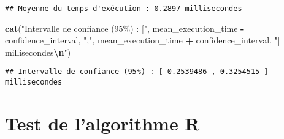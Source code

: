 \documentclass[
]{article}
\newenvironment{Shaded}{\begin{snugshade}}{\end{snugshade}}
\newcommand{\FunctionTok}[1]{\textcolor[rgb]{0.13,0.29,0.53}{\textbf{#1}}}
\newcommand{\NormalTok}[1]{#1}
\newcommand{\SpecialCharTok}[1]{\textcolor[rgb]{0.81,0.36,0.00}{\textbf{#1}}}
\newcommand{\StringTok}[1]{\textcolor[rgb]{0.31,0.60,0.02}{#1}}
\begin{document}
\begin{verbatim}
## Moyenne du temps d'exécution : 0.2897 millisecondes
\end{verbatim}

\begin{Shaded}
\begin{Highlighting}[]
\FunctionTok{cat}\NormalTok{(}\StringTok{"Intervalle de confiance (95\%) : ["}\NormalTok{, mean\_execution\_time }\SpecialCharTok{{-}}\NormalTok{ confidence\_interval,}
    \StringTok{","}\NormalTok{, mean\_execution\_time }\SpecialCharTok{+}\NormalTok{ confidence\_interval, }\StringTok{"] millisecondes}\SpecialCharTok{\textbackslash{}n}\StringTok{"}\NormalTok{)}
\end{Highlighting}
\end{Shaded}

\begin{verbatim}
## Intervalle de confiance (95%) : [ 0.2539486 , 0.3254515 ] millisecondes
\end{verbatim}

\hypertarget{test-de-lalgorithme-r}{%
\section{Test de l'algorithme R}\label{test-de-lalgorithme-r}}
\end{document}
